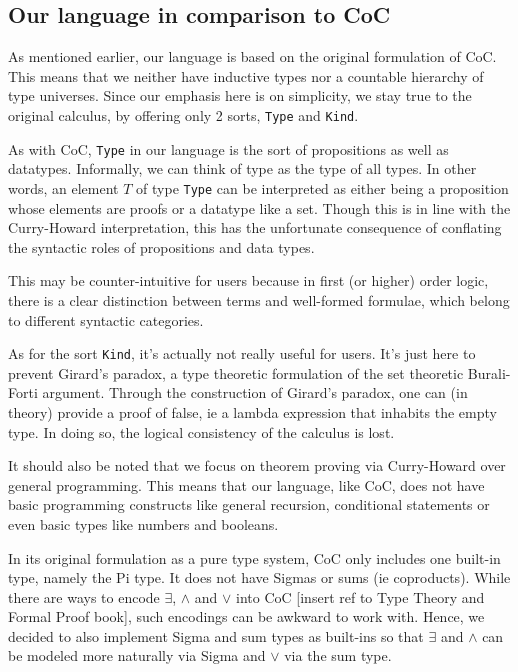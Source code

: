\documentclass{article}
\begin{document}
\subsection{Our language in comparison to CoC}
As mentioned earlier, our language is based on the original
formulation of CoC. This means that we neither have inductive types nor a
countable hierarchy of type universes.
Since our emphasis here is on simplicity, we stay true to the original calculus,
by offering only 2 sorts, \verb|Type| and \verb|Kind|.

As with CoC, \verb|Type| in our language is the sort of propositions as well as 
datatypes. Informally, we can think of type as the type of all types.
In other words, an element $T$ of type \verb|Type| can be interpreted as either
being a proposition whose elements are proofs or a datatype like a set.
Though this is in line with the Curry-Howard interpretation, this has the
unfortunate consequence of conflating the syntactic roles of propositions and
data types.
  
This may be counter-intuitive for users because in first (or higher) order
logic, there is a clear distinction between terms and well-formed formulae,
which belong to different syntactic categories. 

As for the sort \verb|Kind|, it's actually not really useful for users. It's
just here to prevent Girard's paradox, a type theoretic formulation of the set
theoretic Burali-Forti argument.
Through the construction of Girard's paradox, one can (in theory) provide a 
proof of false, ie a lambda expression that inhabits the empty type.
In doing so, the logical consistency of the calculus is lost.

It should also be noted that we focus on theorem proving via Curry-Howard over
general programming. This means that our language, like CoC, does not have
basic programming constructs like general recursion, conditional statements or
even basic types like numbers and booleans.

In its original formulation as a pure type system, CoC only includes one built-in
type, namely the Pi type. It does not have Sigmas or sums (ie coproducts).
While there are ways to encode $\exists$, $\wedge$ and $\vee$ into CoC
[insert ref to Type Theory and Formal Proof book], such encodings can be awkward
to work with. Hence, we decided to also implement Sigma and sum types as built-ins
so that $\exists$ and $\wedge$ can be modeled more naturally via Sigma and
$\vee$ via the sum type.

\end{document}
